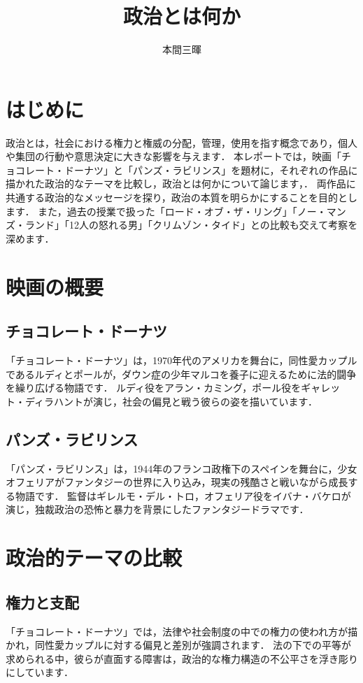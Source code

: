 \documentclass[titlepage,a4paper]{jsarticle}
\title{政治とは何か}
\author{本間三暉}
\begin{document}
\maketitle
\section{はじめに}
政治とは，社会における権力と権威の分配，管理，使用を指す概念であり，個人や集団の行動や意思決定に大きな影響を与えます．
本レポートでは，映画「チョコレート・ドーナツ」と「パンズ・ラビリンス」を題材に，それぞれの作品に描かれた政治的なテーマを比較し，政治とは何かについて論じます，．
両作品に共通する政治的なメッセージを探り，政治の本質を明らかにすることを目的とします．
また，過去の授業で扱った「ロード・オブ・ザ・リング」「ノー・マンズ・ランド」「12人の怒れる男」「クリムゾン・タイド」との比較も交えて考察を深めます．
\section{映画の概要}
\subsection{チョコレート・ドーナツ}
「チョコレート・ドーナツ」は，1970年代のアメリカを舞台に，同性愛カップルであるルディとポールが，ダウン症の少年マルコを養子に迎えるために法的闘争を繰り広げる物語です．
ルディ役をアラン・カミング，ポール役をギャレット・ディラハントが演じ，社会の偏見と戦う彼らの姿を描いています．
\subsection{パンズ・ラビリンス}
「パンズ・ラビリンス」は，1944年のフランコ政権下のスペインを舞台に，少女オフェリアがファンタジーの世界に入り込み，現実の残酷さと戦いながら成長する物語です．
監督はギレルモ・デル・トロ，オフェリア役をイバナ・バケロが演じ，独裁政治の恐怖と暴力を背景にしたファンタジードラマです．
\section{政治的テーマの比較}
\subsection{権力と支配}
「チョコレート・ドーナツ」では，法律や社会制度の中での権力の使われ方が描かれ，同性愛カップルに対する偏見と差別が強調されます．
法の下での平等が求められる中，彼らが直面する障害は，政治的な権力構造の不公平さを浮き彫りにしています．
\end{document}
